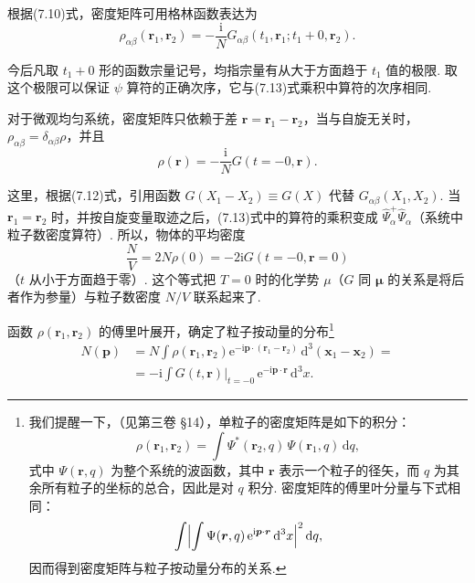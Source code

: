 根据(7.10)式，密度矩阵可用格林函数表达为
\begin{equation}
\rho_{\alpha\beta}(\bm r_1,\bm r_2)=-\frac{\mathrm{i}}{N}G_{\alpha\beta}(t_1,\bm r_1;t_1+0,\bm r_2).
\end{equation}

今后凡取 $t_1+0$ 形的函数宗量记号，均指宗量有从大于方面趋于 $t_1$ 值的极限. 取这个极限可以保证 $\psi$ 算符的正确次序，它与(7.13)式乘积中算符的次序相同.

对于微观均匀系统，密度矩阵只依赖于差 $\bm r=\bm r_1-\bm r_2$，当与自旋无关时，$\rho_{\alpha\beta}=\delta_{\alpha\beta}\rho$，并且
\begin{equation}
\rho(\bm r)=-\frac{\mathrm{i}}{N}G(t=-0,\bm r).
\end{equation}

这里，根据(7.12)式，引用函数 $G(X_1-X_2)\equiv G(X)$ 代替 $G_{\alpha\beta}(X_1,X_2)$. 当 $\bm r_1=\bm r_2$ 时，并按自旋变量取迹之后，(7.13)式中的算符的乘积变成 $\hat\Psi^{+}_\alpha\hat\Psi_\alpha$（系统中粒子数密度算符）. 所以，物体的平均密度
\begin{equation}
\frac{N}{V}=2N\rho(0)=-2\mathrm{i}G(t=-0,\bm r=0)
\end{equation}
（$t$ 从小于方面趋于零）. 这个等式把 $T=0$ 时的化学势 $\mu$（$G$ 同 $\bm\mu$ 的关系是将后者作为参量）与粒子数密度 $N/V$ 联系起来了.

函数 $\rho(\bm r_1,\bm r_2)$ 的傅里叶展开，确定了粒子按动量的分布\footnote{我们提醒一下，（见第三卷 §14），单粒子的密度矩阵是如下的积分：
\begin{equation*}
\rho(\bm r_{1},\bm r_{2})=\int\Psi^{*}(\bm r_{2},q)\,\Psi(\bm r_{1},q)\,\mathrm{d}q,
\end{equation*}
式中 $\Psi(\bm r,q)$ 为整个系统的波函数，其中 $\bm r$ 表示一个粒子的径矢，而 $q$ 为其余所有粒子的坐标的总合，因此是对 $q$ 积分. 密度矩阵的傅里叶分量与下式相同：
\begin{equation*}
\int\Bigl|\int\Psi(\bm r,q)\,\mathrm{e}^{\mathrm{i}\bm p\cdot\bm r}\,\mathrm{d}^{3}x\Bigr|^{2}\,\mathrm{d}q,
\end{equation*}
因而得到密度矩阵与粒子按动量分布的关系.}
\begin{equation}
\begin{aligned}
N(\bm p)&=N\int\rho(\bm r_1,\bm r_2)\mathrm{e}^{-\mathrm{i}\bm p\cdot(\bm r_1-\bm r_2)}\,\mathrm{d}^3(\bm x_1-\bm x_2)=\\
&=-\mathrm{i}\int G(t,\bm r)\big|_{t=-0}\,\mathrm{e}^{-\mathrm{i}\bm p\cdot\bm r}\,\mathrm{d}^3x.
\end{aligned}
\end{equation}

